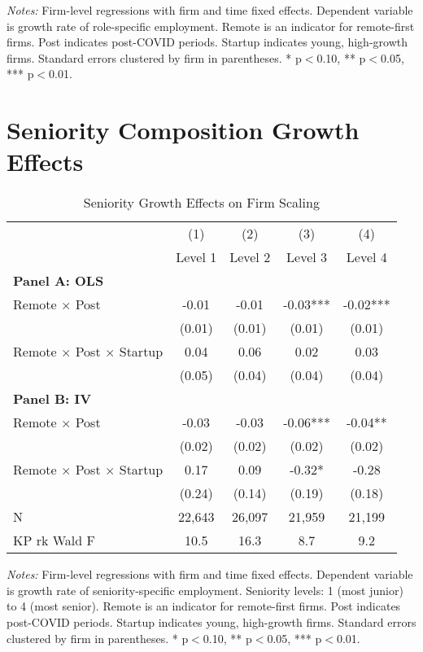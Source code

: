 \documentclass[11pt]{article}
\begin{document}
\noindent \footnotesize \textit{Notes:} Firm-level regressions with firm and time fixed effects. Dependent variable is growth rate of role-specific employment. Remote is an indicator for remote-first firms. Post indicates post-COVID periods. Startup indicates young, high-growth firms. Standard errors clustered by firm in parentheses. * p$<$0.10, ** p$<$0.05, *** p$<$0.01.

\section{Seniority Composition Growth Effects}

\begin{table}[H]
\centering
\caption{Seniority Growth Effects on Firm Scaling}
\begin{tabular}{lcccc}
\toprule
 & (1) & (2) & (3) & (4) \\
 & Level 1 & Level 2 & Level 3 & Level 4 \\
\midrule
\multicolumn{5}{l}{\textbf{Panel A: OLS}} \\
\addlinespace
Remote $\times$ Post & -0.01 & -0.01 & -0.03*** & -0.02*** \\ & (0.01) & (0.01) & (0.01) & (0.01) \\
\addlinespace[0.5em]
Remote $\times$ Post $\times$ Startup & 0.04 & 0.06 & 0.02 & 0.03 \\ & (0.05) & (0.04) & (0.04) & (0.04) \\
\midrule
\multicolumn{5}{l}{\textbf{Panel B: IV}} \\
\addlinespace
Remote $\times$ Post & -0.03 & -0.03 & -0.06*** & -0.04** \\ & (0.02) & (0.02) & (0.02) & (0.02) \\
\addlinespace[0.5em]
Remote $\times$ Post $\times$ Startup & 0.17 & 0.09 & -0.32* & -0.28 \\ & (0.24) & (0.14) & (0.19) & (0.18) \\
\midrule
N & 22,643 & 26,097 & 21,959 & 21,199 \\
KP rk Wald F & 10.5 & 16.3 & 8.7 & 9.2\\
\bottomrule
\end{tabular}
\end{table}

\noindent \footnotesize \textit{Notes:} Firm-level regressions with firm and time fixed effects. Dependent variable is growth rate of seniority-specific employment. Seniority levels: 1 (most junior) to 4 (most senior). Remote is an indicator for remote-first firms. Post indicates post-COVID periods. Startup indicates young, high-growth firms. Standard errors clustered by firm in parentheses. * p$<$0.10, ** p$<$0.05, *** p$<$0.01.
\end{document}
